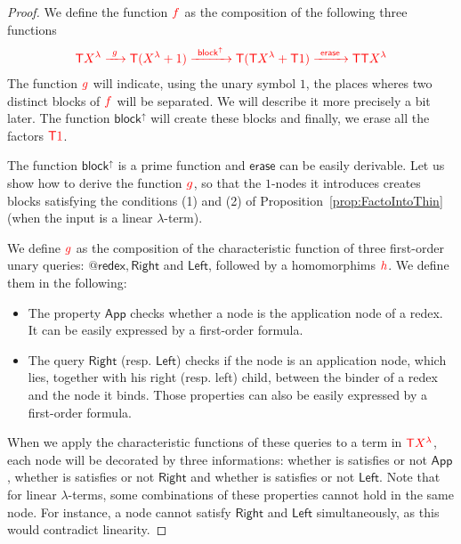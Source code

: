 \begin{proof}
We define the function ${\color{red}{f}}$ as the composition of the following three functions
\begin{align*}
{\color{red}{{\color{red}{\mathsf T}}{\color{red}{X^\lambda}} \xrightarrow{\ g\ } {\color{red}{\mathsf T}}({\color{red}{X^\lambda}}+1) \xrightarrow{\ \mathsf{block}^\uparrow\ } {\color{red}{\mathsf T}}({\color{red}{\mathsf T}}{\color{red}{X^\lambda}}+{\color{red}{\mathsf T}}1)
\xrightarrow{\ \mathsf{erase}\ } {\color{red}{\mathsf T}}{\color{red}{\mathsf T}}{\color{red}{X^\lambda}}}}
\end{align*}
The function ${\color{red}{g}}$ will indicate, using the unary symbol $1$, the places wheres two distinct blocks of ${\color{red}{f}}$ will be separated. We will describe it more precisely a bit later. The function $\mathsf{block}^\uparrow$ will create these blocks and finally, we erase all the factors ${\color{red}{{\color{red}{\mathsf T}}1}}$.

The function $\mathsf{block}^\uparrow$ is a prime function and  $\mathsf{erase}$ can be easily derivable. 
Let us show how to derive the function ${\color{red}{g}}$, so that the $1$-nodes it introduces creates blocks satisfying the conditions (1) and (2) of Proposition~\ref{prop:FactoIntoThin} (when the input is a linear $\lambda$-term).  

We define ${\color{red}{g}}$ as the composition of the characteristic function of three first-order unary queries: $\mathsf{@redex}, \mathsf{Right}$ and $\mathsf{Left}$, followed by a homomorphims ${\color{red}{h}}$. We define them in the following:
\begin{itemize}
\item The property $\mathsf{App}$ checks whether a node is the application node of a redex. It can be easily expressed by a first-order formula.
\item The query $\mathsf{Right}$ (resp. $\mathsf{Left}$) checks if the node is an application node, which lies, together with his right (resp. left) child, between the binder of a redex  and the node it binds. Those properties can also be easily expressed by a first-order formula.
\end{itemize}

When we apply the characteristic functions of these queries to a term in ${\color{red}{{\color{red}{\mathsf T}}X^\lambda}}$, each node will be decorated by three informations: whether is satisfies or not $\mathsf{App}$,  whether is satisfies or not $\mathsf{Right}$ and whether is satisfies or not $\mathsf{Left}$. Note that for linear $\lambda$-terms, some combinations of these properties cannot hold in the same node. For instance, a node cannot satisfy $\mathsf{Right}$ and $\mathsf{Left}$ simultaneously, as this would contradict linearity. 


\end{proof}
